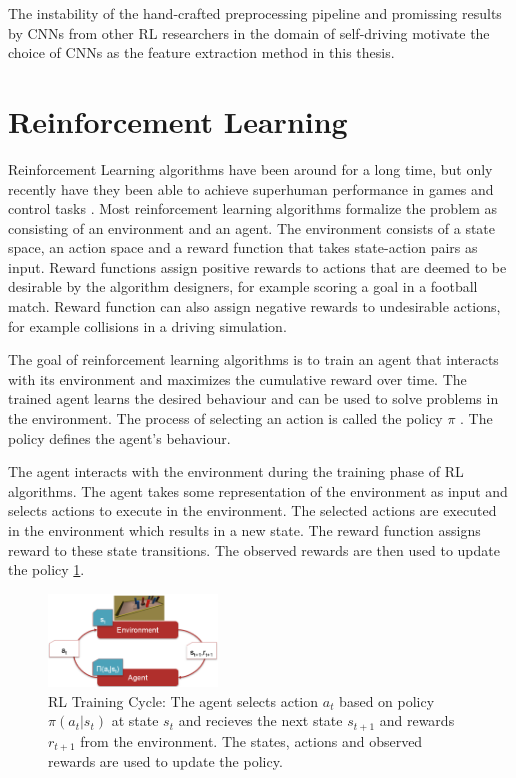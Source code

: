 The instability of the hand-crafted preprocessing pipeline and promissing results by CNNs from other RL researchers in the domain of self-driving \textcite{neptune} motivate the choice of CNNs as the feature extraction method in this thesis. 


\section{Reinforcement Learning}


Reinforcement Learning algorithms have been around for a long time, but only recently have they been able to achieve superhuman performance in games and control tasks \textcite{atari}. Most reinforcement learning algorithms formalize the problem as consisting of an environment and an agent. The environment consists of a state space, an action space and a reward function that takes state-action pairs as input. Reward functions assign positive rewards to actions that are deemed to be desirable by the algorithm designers, for example scoring a goal in a football match. Reward function can also assign negative rewards to undesirable actions, for example collisions in a driving simulation. 

The goal of reinforcement learning algorithms is to train an agent that interacts with its environment and maximizes the cumulative reward over time. The trained agent learns the desired behaviour and can be used to solve problems in the environment. The process of selecting an action is called the policy $\pi$ \textcite{rlbook2020}. The policy defines the agent's behaviour.

The agent interacts with the environment during the training phase of RL algorithms. The agent takes some representation of the environment as input and selects actions to execute in the environment. The selected actions are executed in the environment which results in a new state. The reward function assigns reward to these state transitions.
The observed rewards are then used to update the policy \ref{fig:rlcycle}.

\begin{figure}
    \centering
    \includegraphics[width=0.4\textwidth]{Bilder/rl_cycle.png}
    \caption{RL Training Cycle: The agent selects action $a_t$ based on policy $\pi(a_t|s_t)$ at state $s_t$ and recieves the next state $s_{t+1}$ and rewards $r_{t+1}$ from the environment. The states, actions and observed rewards are used to update the policy.}
    \label{fig:rlcycle}
\end{figure}


